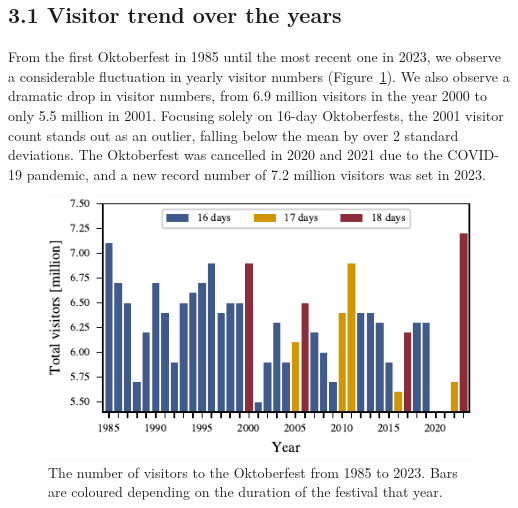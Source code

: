 \documentclass{article}
\theoremstyle{plain}
\theoremstyle{definition}
\theoremstyle{remark}
\begin{document}
\subsection*{3.1 Visitor trend over the years}
From the first Oktoberfest in 1985 until the most recent one in 2023, we observe a considerable fluctuation in yearly visitor numbers (Figure~\ref{figure_visitors}). We also observe a dramatic drop in visitor numbers, from 6.9 million visitors in the year 2000 to only 5.5 million in 2001. Focusing solely on 16-day Oktoberfests, the 2001 visitor count stands out as an outlier, falling below the mean by over 2 standard deviations. The Oktoberfest was cancelled in 2020 and 2021 due to the COVID-19 pandemic, and a new record number of 7.2 million visitors was set in 2023. 
\begin{figure}[ht]%
  \includegraphics{fig/totalvisitors.pdf}
  \caption{The number of visitors to the Oktoberfest from 1985 to 2023. Bars are coloured depending on the duration of the festival that year.}
  \label{figure_visitors}
\end{figure}
\end{document}
